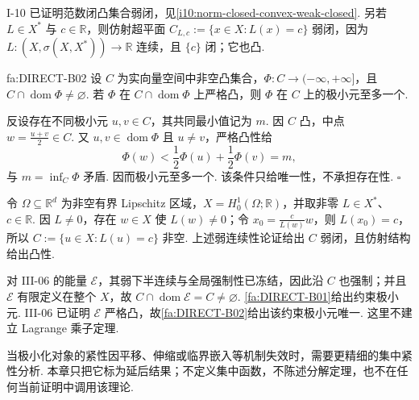 I-10 已证明范数闭凸集合弱闭，见\autoref{i10:norm-closed-convex-weak-closed}. 另若 \(\displaystyle L\in X^*\) 与 \(\displaystyle c\in\mathbb R\)，则仿射超平面
\(\displaystyle C_{L,c}:=\{x\in X:L(x)=c\}\)
弱闭，因为 \(\displaystyle L:(X,\sigma(X,X^*))\to\mathbb R\) 连续，且 \(\displaystyle\{c\}\) 闭；它也凸.

\begin{FATheorem}[B][严格凸性给出唯一性]{fa:DIRECT-B02}
设 \(\displaystyle C\) 为实向量空间中非空凸集合，\(\displaystyle\Phi:C\to(-\infty,+\infty]\)，且 \(\displaystyle C\cap\operatorname{dom}\Phi\neq\varnothing\). 若 \(\displaystyle\Phi\) 在 \(\displaystyle C\cap\operatorname{dom}\Phi\) 上严格凸，则 \(\displaystyle\Phi\) 在 \(\displaystyle C\) 上的极小元至多一个.
\end{FATheorem}

\begin{FAProof}
反设存在不同极小元 \(\displaystyle u,v\in C\)，其共同最小值记为 \(\displaystyle m\). 因 \(\displaystyle C\) 凸，中点 \(\displaystyle w=\frac{u+v}{2}\in C\). 又 \(\displaystyle u,v\in\operatorname{dom}\Phi\) 且 \(\displaystyle u\neq v\)，严格凸性给
\[
\Phi(w)
<
\frac{1}{2}\Phi(u)+\frac{1}{2}\Phi(v)
=
m,
\]
与 \(\displaystyle m=\inf_C\Phi\) 矛盾. 因而极小元至多一个. 该条件只给唯一性，不承担存在性.
\hfill\(\square\)
\end{FAProof}

\begin{FAApplication}[仿射约束上的能量极小化]
令 \(\displaystyle\Omega\subseteq\mathbb R^d\) 为非空有界 Lipschitz 区域，\(\displaystyle X=H_0^1(\Omega;\mathbb R)\)，并取非零 \(\displaystyle L\in X^*\)、\(\displaystyle c\in\mathbb R\). 因 \(\displaystyle L\neq0\)，存在 \(\displaystyle w\in X\) 使 \(\displaystyle L(w)\neq0\)；令 \(\displaystyle x_0=\frac{c}{L(w)}w\)，则 \(\displaystyle L(x_0)=c\)，所以
\(\displaystyle C:=\{u\in X:L(u)=c\}\)
非空. 上述弱连续性论证给出 \(\displaystyle C\) 弱闭，且仿射结构给出凸性.

对 III-06 的能量 \(\displaystyle\mathcal E\)，其弱下半连续与全局强制性已冻结，因此沿 \(\displaystyle C\) 也强制；并且 \(\displaystyle\mathcal E\) 有限定义在整个 \(\displaystyle X\)，故 \(\displaystyle C\cap\operatorname{dom}\mathcal E=C\neq\varnothing\). \autoref{fa:DIRECT-B01}给出约束极小元. III-06 已证明 \(\displaystyle\mathcal E\) 严格凸，故\autoref{fa:DIRECT-B02}给出该约束极小元唯一. 这里不建立 Lagrange 乘子定理.
\end{FAApplication}

\begin{FARemark}[集中紧性的边界]
当极小化对象的紧性因平移、伸缩或临界嵌入等机制失效时，需要更精细的集中紧性分析. 本章只把它标为延后结果；不定义集中函数，不陈述分解定理，也不在任何当前证明中调用该理论.
\end{FARemark}

